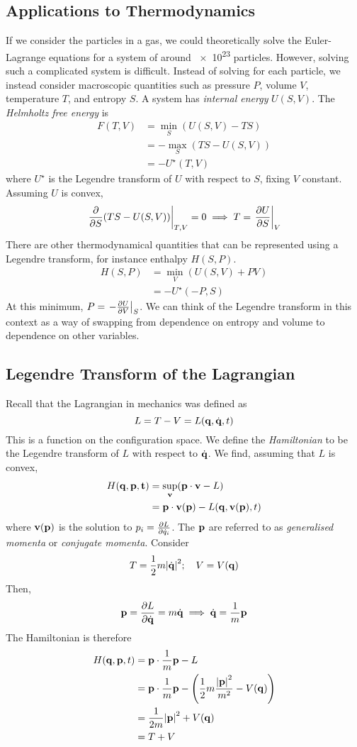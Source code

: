 \subsection{Applications to Thermodynamics}
If we consider the particles in a gas, we could theoretically solve the Euler-Lagrange equations for a system of around \num{e23} particles.
However, solving such a complicated system is difficult.
Instead of solving for each particle, we instead consider macroscopic quantities such as pressure \( P \), volume \( V \), temperature \( T \), and entropy \( S \).
A system has \textit{internal energy} \( U(S, V) \).
The \textit{Helmholtz free energy} is
\begin{align*}
    F(T, V) &= \min_S (U(S, V) - TS) \\
    &= - \max_S (TS - U(S, V)) \\
    &= -U^\star(T, V)
\end{align*}
where \( U^\star \) is the Legendre transform of \( U \) with respect to \( S \), fixing \( V \) constant.
Assuming \( U \) is convex,
\[ \eval{\pdv{S} \qty(TS - U(S,V))}_{T,V} = 0 \implies T = \eval{\pdv{U}{S}}_{V} \]
There are other thermodynamical quantities that can be represented using a Legendre transform, for instance enthalpy \( H(S, P) \).
\begin{align*}
    H(S, P) &= \min_V (U(S,V) + PV) \\
    &= - U^\star(-P, S)
\end{align*}
At this minimum, \( P = \eval{-\pdv{U}{V}}_S \).
We can think of the Legendre transform in this context as a way of swapping from dependence on entropy and volume to dependence on other variables.

\subsection{Legendre Transform of the Lagrangian}
Recall that the Lagrangian in mechanics was defined as
\[ L = T - V = L(\vb q, \dot{\vb q}, t) \]
This is a function on the configuration space.
We define the \textit{Hamiltonian} to be the Legendre transform of \( L \) with respect to \( \dot{\vb q} \).
We find, assuming that \( L \) is convex,
\begin{align*}
    H(\vb q, \vb p, \vb t) &= \sup_{\vb v} (\vb p \cdot \vb v - L) \\
    &= \vb p \cdot \vb v(\vb p) - L(\vb q, \vb v(\vb p), t)
\end{align*}
where \( \vb v(\vb p) \) is the solution to \( p_i = \pdv{L}{\dot{q}_i} \).
The \( \vb p \) are referred to as \textit{generalised momenta} or \textit{conjugate momenta}.
Consider
\[ T = \frac{1}{2}m \abs{\dot{\vb q}}^2;\quad V = V(\vb q) \]
Then,
\[ \vb p = \pdv{L}{\dot{\vb q}} = m \dot{\vb q} \implies \dot{\vb q} = \frac{1}{m} \vb p \]
The Hamiltonian is therefore
\begin{align*}
    H(\vb q, \vb p, t) &= \vb p \cdot \frac{1}{m} \vb p - L \\
    &= \vb p \cdot \frac{1}{m} \vb p - \qty(\frac{1}{2}m \frac{\abs{\vb p}^2}{m^2} - V(\vb q)) \\
    &= \frac{1}{2m} \abs{\vb p}^2 + V(\vb q) \\
    &= T + V
\end{align*}

